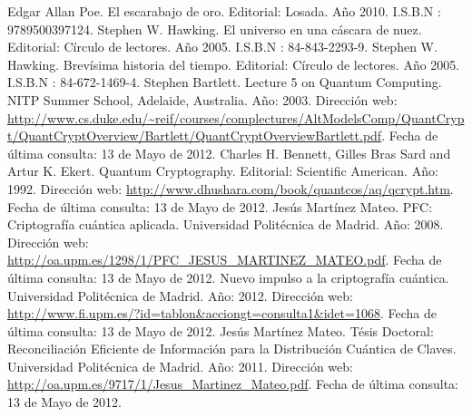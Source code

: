 \documentclass[a4paper,12pt,twoside,openright]{report}
\begin{document}
%

%






 

% 

\begin{thebibliography}{8}
 Edgar Allan Poe. El escarabajo de oro. Editorial: Losada. Año 2010. I.S.B.N : 9789500397124.
 Stephen W. Hawking. El universo en una cáscara de nuez. Editorial: Círculo de lectores. Año 2005. I.S.B.N : 84-843-2293-9.
  Stephen W. Hawking. Brevísima historia del tiempo. Editorial: Círculo de lectores. Año 2005. I.S.B.N : 84-672-1469-4.
 Stephen Bartlett. Lecture 5 on Quantum Computing. NITP Summer School, Adelaide, Australia. Año: 2003. Dirección web: \url{http://www.cs.duke.edu/~reif/courses/complectures/AltModelsComp/QuantCrypt/QuantCryptOverview/Bartlett/QuantCryptOverviewBartlett.pdf}. Fecha de última consulta: 13 de Mayo de 2012.
 Charles H. Bennett, Gilles Bras Sard and Artur K. Ekert. Quantum Cryptography. Editorial: Scientific American. Año: 1992. Dirección web: \url{http://www.dhushara.com/book/quantcos/aq/qcrypt.htm}. Fecha de última consulta: 13 de Mayo de 2012.
 Jesús Martínez Mateo. PFC: Criptografía cuántica aplicada. Universidad Politécnica de Madrid. Año: 2008. Dirección web: \url{http://oa.upm.es/1298/1/PFC_JESUS_MARTINEZ_MATEO.pdf}.  Fecha de última consulta: 13 de Mayo de 2012.
 Nuevo impulso a la criptografía cuántica. Universidad Politécnica de Madrid. Año: 2012. Dirección web: \url{http://www.fi.upm.es/?id=tablon&acciongt=consulta1&idet=1068}. Fecha de última consulta: 13 de Mayo de 2012. 
 Jesús Martínez Mateo. Tésis Doctoral: Reconciliación Eficiente de Información para la Distribución Cuántica de Claves. Universidad Politécnica de Madrid. Año: 2011. Dirección web: \url{http://oa.upm.es/9717/1/Jesus_Martinez_Mateo.pdf}. Fecha de última consulta: 13 de Mayo de 2012.
\end{thebibliography}
\end{document}
